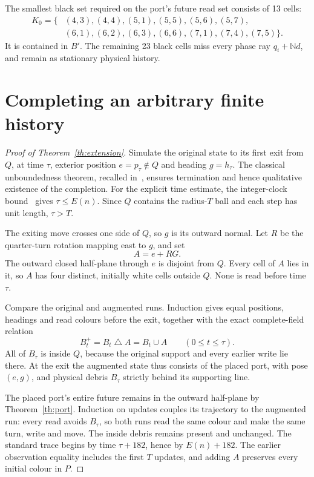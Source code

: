 \documentclass[11pt]{article}
\newcommand{\N}{\mathbb N}
\begin{document}
The smallest black set required on the port's future read set consists of
13 cells:
\begin{align*}
 K_0=\{&(4,3),(4,4),(5,1),(5,5),(5,6),(5,7),\\
       &(6,1),(6,2),(6,3),(6,6),(7,1),(7,4),(7,5)\}.
\end{align*}
It is contained in $B'$. The remaining 23 black cells miss every phase ray
$q_i+\N d$, and remain as stationary physical history.

\section{Completing an arbitrary finite history}
\begin{proof}[Proof of Theorem~\ref{th:extension}]
Simulate the original state to its first exit from $Q$, at time $\tau$,
exterior position $e=p_\tau\notin Q$ and heading $g=h_\tau$.
The classical unboundedness theorem, recalled in~\cite{etse2026}, ensures
termination and hence qualitative existence of the completion. For the
explicit time estimate, the integer-clock bound~\cite{clock2026} gives
$\tau\le E(n)$. Since $Q$ contains the radius-$T$ ball and each step has
unit length, $\tau>T$.

The exiting move crosses one side of $Q$, so $g$ is its outward normal.
Let $R$ be the quarter-turn rotation mapping east to $g$, and set
\[
 A=e+RG.
\]
The outward closed half-plane through $e$ is disjoint from $Q$.
Every cell of $A$ lies in it, so $A$ has four distinct, initially white cells
outside $Q$. None is read before time $\tau$.

Compare the original and augmented runs. Induction gives equal positions,
headings and read colours before the exit, together with the exact complete-field
relation
\[
 B_t^+=B_t\mathbin{\triangle}A=B_t\cup A
 \qquad(0\le t\le\tau).
\]
All of $B_\tau$ is inside $Q$, because the original support and every earlier
write lie there. At the exit the augmented state thus consists of the placed
port, with pose $(e,g)$, and physical debris $B_\tau$ strictly behind its
supporting line.

The placed port's entire future remains in the outward half-plane by
Theorem~\ref{th:port}. Induction on updates couples its trajectory to the
augmented run: every read avoids $B_\tau$, so both runs read the same colour
and make the same turn, write and move. The inside debris remains present
and unchanged. The standard trace begins by time $\tau+182$, hence by
$E(n)+182$. The earlier observation equality includes the first $T$ updates,
and adding $A$ preserves every initial colour in $P$.
\end{proof}
\end{document}
